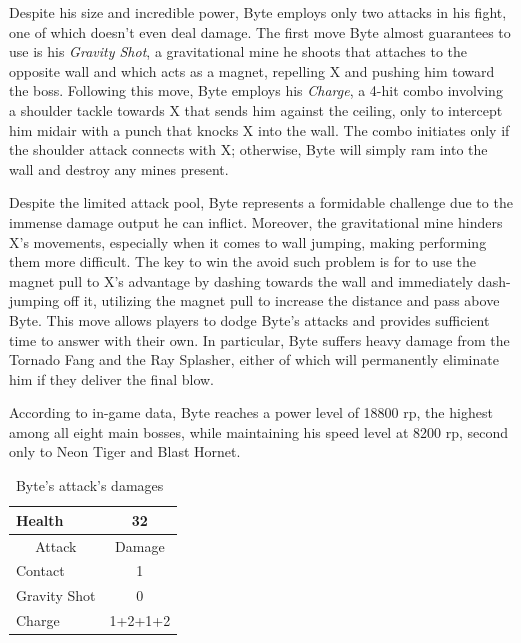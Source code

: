 Despite his size and incredible power, Byte employs only two attacks in his fight, one of which doesn't even deal damage. The first move Byte almost guarantees to use is his \emph{Gravity Shot}, a gravitational mine he shoots that attaches to the opposite wall and which acts as a magnet, repelling X and pushing him toward the boss. Following this move, Byte employs his \emph{Charge}, a 4-hit combo involving a shoulder tackle towards X that sends him against the ceiling, only to intercept him midair with a punch that knocks X into the wall. The combo initiates only if the shoulder attack connects with X; otherwise, Byte will simply ram into the wall and destroy any mines present.


Despite the limited attack pool, Byte represents a formidable challenge due to the immense damage output he can inflict. Moreover, the gravitational mine hinders X's movements, especially when it comes to wall jumping, making performing them more difficult. The key to win the avoid such problem is for to use the magnet pull to X's advantage by dashing towards the wall and immediately dash-jumping off it, utilizing the magnet pull to increase the distance and pass above Byte. This move allows players to dodge Byte's attacks and provides sufficient time to answer with their own. In particular, Byte suffers heavy damage from the Tornado Fang and the Ray Splasher, either of which will permanently eliminate him if they deliver the final blow.

According to in-game data, Byte reaches a power level of 18800 rp, the highest among all eight main bosses, while maintaining his speed level at 8200 rp, second only to Neon Tiger and Blast Hornet.

\begin{table}[htp]
	\centering
	\begin{tabular}[h]{l c}
		\toprule
		Health  & 32\\
		\midrule
		\multicolumn{1}{c}{Attack} & \multicolumn{1}{c}{Damage}\\
		Contact & 1\\
		Gravity Shot& 0\\
		Charge& 1+2+1+2\\
		\bottomrule
	\end{tabular}
	\caption{Byte's attack's damages~\cite{wiki:Byte,book:Compendium}}
\end{table} 

